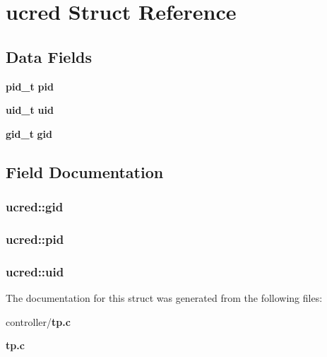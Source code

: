 \section{ucred Struct Reference}
\label{structucred}
\subsection*{Data Fields}
\begin{DoxyCompactItemize}
\item 
{\bf pid\_\-t} {\bf pid}
\item 
{\bf uid\_\-t} {\bf uid}
\item 
{\bf gid\_\-t} {\bf gid}
\end{DoxyCompactItemize}


\subsection{Field Documentation}
\subsubsection[{gid}]{ {\bf ucred::gid}}\label{structucred_a13f05fba775671b7f2eadab16235ba4e}
\subsubsection[{pid}]{ {\bf ucred::pid}}\label{structucred_a41831a1f0330604f52d7b066af560f11}
\subsubsection[{uid}]{ {\bf ucred::uid}}\label{structucred_a7da93b7ce44f31c9e4d06ab0180c4f01}


The documentation for this struct was generated from the following files:\begin{DoxyCompactItemize}
\item 
controller/{\bf tp.c}\item 
{\bf tp.c}\end{DoxyCompactItemize}
